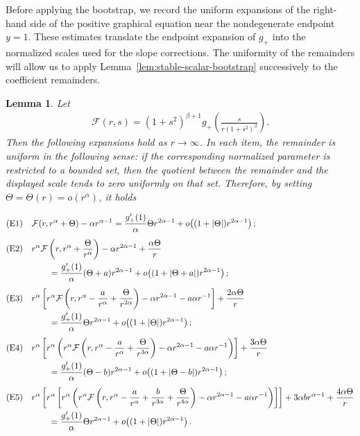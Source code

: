 \documentclass{amsart}
\theoremstyle{plain}
\newtheorem{lemma}[theorem]{Lemma}
\theoremstyle{mainintrothm}
\theoremstyle{definition}
\begin{document}
	Before applying the bootstrap, we record the uniform expansions of the
	right-hand side of the positive graphical equation near the nondegenerate
	endpoint $y=1$.  These estimates translate the endpoint expansion of $g_+$
	into the normalized scales used for the slope corrections.  The uniformity of
	the remainders will allow us to apply Lemma~\ref{lem:stable-scalar-bootstrap}
	successively to the coefficient remainders.
	
	\begin{lemma}
		\label{lem:uniform-expansions-nondegenerate}
		Let
		\begin{align*}
			\mathcal F(r,s)
			=
			(1+s^2)^{\beta+1}
			g_+\left(\frac{s}{r(1+s^2)^\beta}\right).
		\end{align*}
		Then the following expansions hold as $r\to\infty$.  In each item, the
		remainder is uniform in the following sense: if the corresponding normalized
		parameter is restricted to a bounded set, then the quotient between the
		remainder and the displayed scale tends to zero uniformly on that set. Therefore, by setting $\Theta=\Theta(r)=o(r^\alpha)$, it holds 
		
	\begin{align*}
		\textup{(E1)}\quad
		&\mathcal F(r,r^\alpha+\Theta)-\alpha r^{\alpha-1}
		=
		\frac{g_+'(1)}{\alpha}\Theta r^{2\alpha-1}
		+
		o\!\left((1+|\Theta|)r^{2\alpha-1}\right);
		\\[4pt]
		\textup{(E2)}\quad
		& r^\alpha \mathcal F\left(r,r^\alpha+\frac{\Theta}{r^\alpha}\right)
		-
		\alpha r^{2\alpha-1}
		+
		\frac{\alpha\Theta}{r}
		\\
		& \qquad =
		\frac{g_+'(1)}{\alpha}(\Theta+a)r^{2\alpha-1}
		+
		o\!\left((1+|\Theta+a|)r^{2\alpha-1}\right);
		\\[4pt]
		\textup{(E3)}\quad
		& r^\alpha\left[
		r^\alpha \mathcal F\left(r,r^\alpha-\frac{a}{r^\alpha}
		+
		\frac{\Theta}{r^{2\alpha}}\right)
		-
		\alpha r^{2\alpha-1}
		-
		a\alpha r^{-1}
		\right]
		+
		\frac{2\alpha\Theta}{r}
		\\
		& \qquad =
		\frac{g_+'(1)}{\alpha}\Theta r^{2\alpha-1}
		+
		o\!\left((1+|\Theta|)r^{2\alpha-1}\right);
		\\[4pt]
		\textup{(E4)}\quad
		& r^\alpha\left[
		r^\alpha\left(
		r^\alpha \mathcal F\left(r,r^\alpha-\frac{a}{r^\alpha}
		+
		\frac{\Theta}{r^{3\alpha}}\right)
		-
		\alpha r^{2\alpha-1}
		-
		a\alpha r^{-1}
		\right)
		\right]
		+
		\frac{3\alpha\Theta}{r}
		\\
		& \qquad =
		\frac{g_+'(1)}{\alpha}(\Theta-b)r^{2\alpha-1}
		+
		o\!\left((1+|\Theta-b|)r^{2\alpha-1}\right);
		\\[4pt]
		\textup{(E5)}\quad
		& r^\alpha\left[
		r^\alpha\left[
		r^\alpha\left(
		r^\alpha \mathcal F\left(
		r,
		r^\alpha-
		\frac{a}{r^\alpha}
		+
		\frac{b}{r^{3\alpha}}
		+
		\frac{\Theta}{r^{4\alpha}}
		\right)
		-
		\alpha r^{2\alpha-1}
		-
		a\alpha r^{-1}
		\right)
		\right]
		\right]
		+
		3\alpha b r^{\alpha-1}
		+
		\frac{4\alpha\Theta}{r}
		\\
		& \qquad =
		\frac{g_+'(1)}{\alpha}\Theta r^{2\alpha-1}
		+
		o\!\left((1+|\Theta|)r^{2\alpha-1}\right).
	\end{align*}
	\end{lemma}
	
\end{document}
